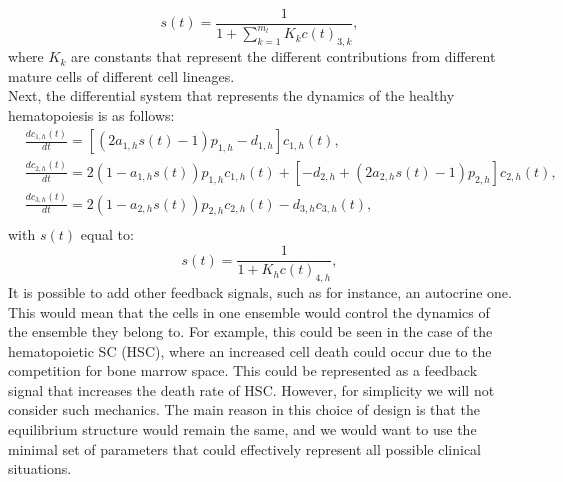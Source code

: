 \documentclass[a4paper,10pt]{article}
\begin{document}
\begin{equation}
s(t)=\frac{1}{1+\sum_{k=1}^{m_l}K_kc(t)_{3,k}},
\label{eq:sig}
\end{equation}
where $K_k$ are constants that represent the different contributions
from different mature cells of different cell lineages. \\
Next, the differential system that represents the dynamics of the healthy hematopoiesis
is as follows:
\begin{equation}
\begin{array}{ll}
& \frac{dc_{1,h}(t)}{dt}= [(2a_{1,h}s(t)-1)p_{1,h}-d_{1,h}]c_{1,h}(t),\\
& \frac{dc_{2,h}(t)}{dt}=2(1-a_{1,h}s(t))p_{1,h}c_{1,h}(t) +[-d_{2,h}+(2a_{2,h}s(t)-1)p_{2,h}]c_{2,h}(t), \\
& \frac{dc_{3,h}(t)}{dt}=2(1-a_{2,h}s(t))p_{2,h}c_{2,h}(t)-d_{3,h}c_{3,h}(t), \\
\end{array}
\label{eq:sist1}
\end{equation}
with $s(t)$ equal to:
\begin{equation}
s(t)=\frac{1}{1+K_hc(t)_{4,h}},
\end{equation}
It is possible to add other feedback signals, such as for instance, an autocrine one.
This would mean that the cells in one ensemble
would control the dynamics of the ensemble they belong to.
For example, this could be seen in the case of the hematopoietic SC (HSC),
where an increased cell death could occur due
to  the competition for bone marrow space.
This could be represented as a feedback signal that increases
\cite{griffin1986clonogenic,calvi2003osteoblastic,zhang2003identification, garrido2001acute} 
the death rate of HSC. However, for simplicity
we will not consider such mechanics.
The main reason in this choice of design is that the equilibrium 
structure would remain the same, and
we would want to use the minimal set of parameters 
that could effectively represent all possible clinical situations.\\
\end{document}
